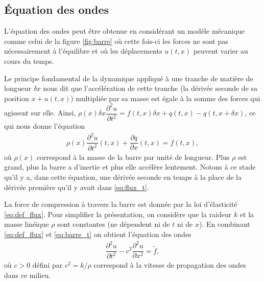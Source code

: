 \documentclass[12pt,a4paper,twoside]{article}
\begin{document}
\subsection{\'Equation des ondes}

L'\'equation des ondes peut \^etre obtenue en consid\'erant un mod\`ele m\'ecanique
comme celui de la figure \ref{fig:barre} o\`u cette fois-ci les forces ne
sont pas n\'ecessairement \`a l'\'equilibre et o\`u les d\'eplacements
$u(t,x)$ peuvent varier au cours du temps.

Le principe fondamental de la dynamique appliqu\'e \`a une tranche de mati\`ere
de longueur $\delta x$ nous dit que l'acc\'el\'eration de cette tranche (la d\'eriv\'ee seconde de sa position
$x+u(t,x)$) multipli\'ee par sa masse est \'egale \`a la somme des forces qui
agissent sur elle.
Ainsi, $\rho(x) \delta x \dfrac{\partial^2 u}{\partial t^2} = 
f(t,x) \delta x + q(t,x) - q(t, x + \delta x)$, ce qui nous donne l'\'equation
\begin{align}
  \label{eq:barre_t}
  \rho(x) \dfrac{\partial^2 u}{\partial t^2}(t,x) + \dfrac{\partial q}{\partial x}(t,x) = f(t,x) ,
\end{align}
o\`u $\rho(x)$ correspond \`a la masse de la barre par unit\'e de longueur.
Plus $\rho$ est grand, plus la barre a d'inertie et plus elle acc\'el\`ere lentement.
Notons \`a ce stade qu'il y a, dans cette \'equation, une d\'eriv\'ee seconde en temps
\`a la place de la d\'eriv\'ee premi\`ere qu'il y avait dans \eqref{eq:flux_t}.

La force de compression \`a travers la barre est donn\'ee par la loi d'\'elasticit\'e
\eqref{eq:def_flux}.
Pour simplifier la pr\'esentation, on consid\`ere que la raideur $k$ et la masse
lin\'eique $\rho$ sont constantes (ne d\'ependent ni de $t$ ni de $x$).
En combinant \eqref{eq:def_flux} et \eqref{eq:barre_t} on obtient l'\'equation des ondes
\begin{align}
  \label{eq:ondes}
  \dfrac{\partial^2 u}{\partial t^2} - c^2 \dfrac{\partial^2 u}{\partial x^2} = \widetilde{f} ,
\end{align}
o\`u $c>0$ d\'efini par $c^2 = k/\rho$ correspond \`a la vitesse de propagation
des ondes dans ce milieu.
\end{document}
